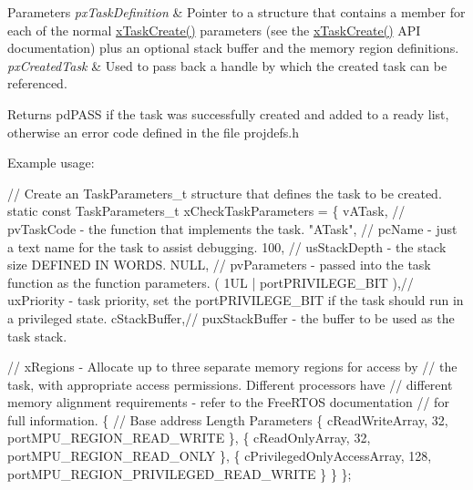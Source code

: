 \begin{DoxyParams}{Parameters}
{\em px\+Task\+Definition} & Pointer to a structure that contains a member for each of the normal \hyperlink{vendor_2ceedling_2plugins_2freertos_2src_2freertos_2include_2task_8h_adf67e7cd0bfd1eda9e8afd048206f7c2}{x\+Task\+Create()} parameters (see the \hyperlink{vendor_2ceedling_2plugins_2freertos_2src_2freertos_2include_2task_8h_adf67e7cd0bfd1eda9e8afd048206f7c2}{x\+Task\+Create()} A\+PI documentation) plus an optional stack buffer and the memory region definitions.\\
\hline
{\em px\+Created\+Task} & Used to pass back a handle by which the created task can be referenced.\\
\hline
\end{DoxyParams}
\begin{DoxyReturn}{Returns}
pd\+P\+A\+SS if the task was successfully created and added to a ready list, otherwise an error code defined in the file projdefs.\+h
\end{DoxyReturn}
Example usage\+: 
\begin{DoxyPre}
// Create an TaskParameters\_t structure that defines the task to be created.
static const TaskParameters\_t xCheckTaskParameters =
\{
    vATask,     // pvTaskCode - the function that implements the task.
    "ATask",    // pcName - just a text name for the task to assist debugging.
    100,        // usStackDepth - the stack size DEFINED IN WORDS.
    NULL,       // pvParameters - passed into the task function as the function parameters.
    ( 1UL | portPRIVILEGE\_BIT ),// uxPriority - task priority, set the portPRIVILEGE\_BIT if the task should run in a privileged state.
    cStackBuffer,// puxStackBuffer - the buffer to be used as the task stack.\end{DoxyPre}



\begin{DoxyPre}    // xRegions - Allocate up to three separate memory regions for access by
    // the task, with appropriate access permissions.  Different processors have
    // different memory alignment requirements - refer to the FreeRTOS documentation
    // for full information.
    \{
        // Base address                 Length  Parameters
        \{ cReadWriteArray,              32,     portMPU\_REGION\_READ\_WRITE \},
        \{ cReadOnlyArray,               32,     portMPU\_REGION\_READ\_ONLY \},
        \{ cPrivilegedOnlyAccessArray,   128,    portMPU\_REGION\_PRIVILEGED\_READ\_WRITE \}
    \}
\};\end{DoxyPre}



